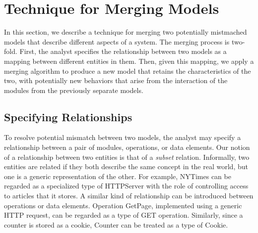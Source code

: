 
\section{Technique for Merging Models}
\label{sec-merging}

In this section, we describe a technique for merging two potentially
mistmached models that describe different aspects of a system. The
merging process is two-fold. First, the analyst specifies the
relationship between two models as a mapping between different
entities in them. Then, given this mapping, we apply a merging algorithm
to produce a new model that retains the characteristics of the two,
with potentially new behaviors that arise from the interaction of the
modules from the previously separate models.

\subsection{Specifying Relationships}
\label{sec-relationship}

To resolve potential mismatch between two models, the analyst may
specify a relationship between a pair of modules, operations, or data
elements. Our notion of a relationship between two entities is that of
a \textit{subset} relation. Informally, two entities are related if
they both describe the same concept in the real world, but one is a
generic representation of the other. For example,
\textsf{NYTimes} can be regarded as a specialized type of
\textsf{HTTPServer} with the role of controlling access to articles
that it stores.  A similar kind of relationship can be introduced
between operations or data elements. Operation \textsf{GetPage},
implemented using a generic HTTP request, can be regarded as a type of
\textsf{GET} operation. Similarly, since a counter is stored as a
cookie, \textsf{Counter} can be treated as a type of \textsf{Cookie}.

